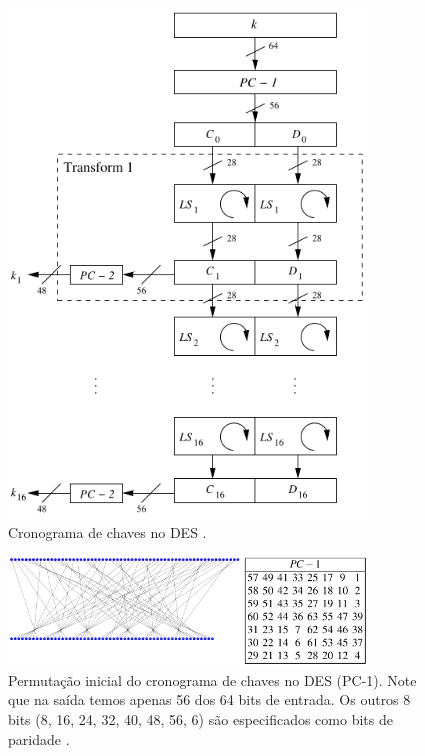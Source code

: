 \begin{frame}[allowframebreaks]
\begin{figure}[h]
\centering
\includegraphics[width=0.85\textwidth,height=0.65\textheight,keepaspectratio]{figures/DES-keyschedule.png}
\caption{Cronograma de chaves no DES \cite{paar2014}.}
\label{fig-DES-keyschedule}
\end{figure}

 \framebreak

\begin{figure}[h]
\centering
\includegraphics[width=0.85\textwidth,height=0.65\textheight,keepaspectratio]{figures/DES-keyschedule-PC1.png}
\caption{Permutação inicial do cronograma de chaves no DES (PC-1). Note que na saída temos apenas 56 dos 64 bits de entrada. Os outros 8 bits (8, 16, 24, 32, 40, 48, 56, 6) são especificados como bits de paridade \cite{wikides2023,paar2014}.}
\label{fig-DES-keyschedule-PC1}
\end{figure}


\end{frame}
